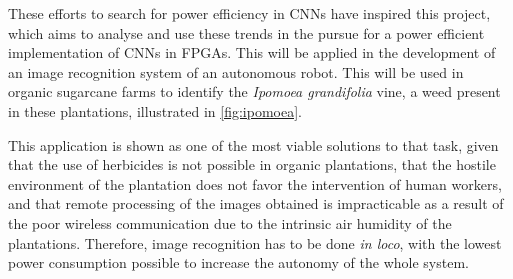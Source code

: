 \documentclass[
    12pt,                       %
    oneside,                    %
    a4paper,                    %
    brazil,                     %
    french,                     %
    spanish,                    %
    english,                    %
    ]{abntex2}
\begin{document}

These efforts to search for power efficiency in CNNs have inspired this project, which aims to analyse and use these trends in the pursue for a power efficient implementation of CNNs in FPGAs. This will be applied in the development of an image recognition system of an autonomous robot. This will be used in organic sugarcane farms to identify the \textit{Ipomoea grandifolia} vine, a weed present in these plantations, illustrated in \autoref{fig:ipomoea}.



This application is shown as one of the most viable solutions to that task, given that the use of herbicides is not possible in organic plantations, that the hostile environment of the plantation does not favor the intervention of human workers, and that remote processing of the images obtained is impracticable as a result of the poor wireless communication due to the intrinsic air humidity of the plantations. Therefore, image recognition has to be done \textit{in loco}, with the lowest power consumption possible to increase the autonomy of the whole system.
\end{document}
